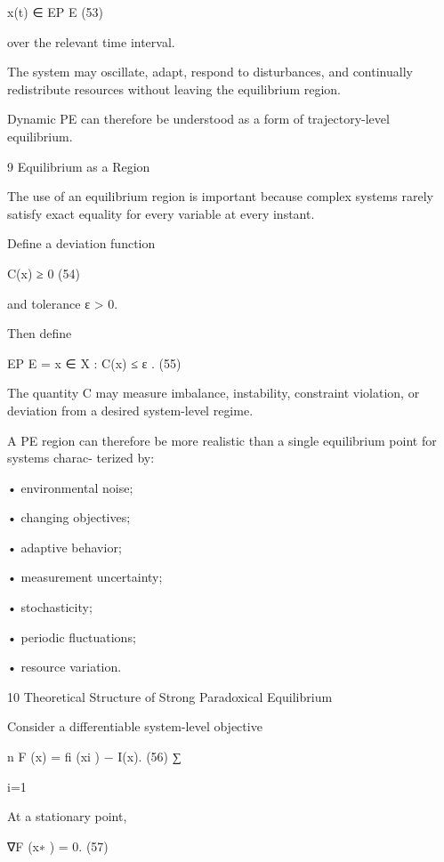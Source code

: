 \documentclass[10pt,a4paper]{article}
\begin{document}
\begin{ManuscriptText}
                                            x(t) ∈ EP E                                        (53)

over the relevant time interval.

The system may oscillate, adapt, respond to disturbances, and continually redistribute resources
without leaving the equilibrium region.

Dynamic PE can therefore be understood as a form of trajectory-level equilibrium.


9     Equilibrium as a Region

The use of an equilibrium region is important because complex systems rarely satisfy exact
equality for every variable at every instant.

Define a deviation function


                                            C(x) ≥ 0                                           (54)

and tolerance ε > 0.


Then define


                                  EP E = {x ∈ X : C(x) ≤ ε} .                             (55)

The quantity C may measure imbalance, instability, constraint violation, or deviation from a
desired system-level regime.

A PE region can therefore be more realistic than a single equilibrium point for systems charac-
terized by:

  • environmental noise;

  • changing objectives;

  • adaptive behavior;

  • measurement uncertainty;

  • stochasticity;

  • periodic fluctuations;

  • resource variation.


10     Theoretical Structure of Strong Paradoxical Equilibrium

Consider a differentiable system-level objective

                                              n
                                   F (x) =         fi (xi ) − I(x).                       (56)
                                             ∑︂

                                             i=1

At a stationary point,


                                         ∇F (x∗ ) = 0.                                    (57)


\end{ManuscriptText}
\end{document}
